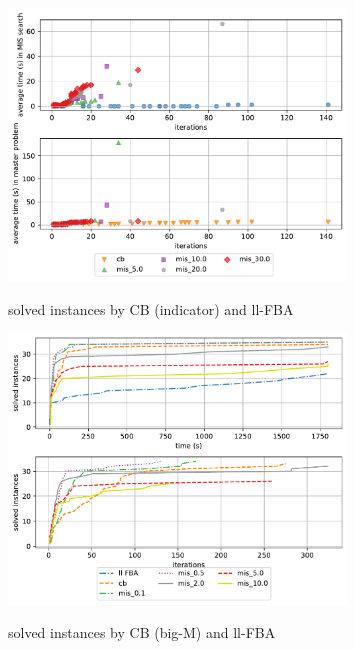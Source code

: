 \begin{figure}[h!]
    \caption{solved instances by CB (indicator) and ll-FBA}
    \centering
    \includegraphics[width=0.8\textwidth]{Images/mis_comparison_time_vs_iterations.pdf}
    \label{fig:mis_comparison_time_vs_iterations}
\end{figure}

\begin{figure}[h!]
    \caption{solved instances by CB (big-M) and ll-FBA}
    \centering
    \includegraphics[width=0.8\textwidth]{Images/mis_comparison_solved_instances_big_m.pdf}
    \label{fig:mis_comparison_solved_instances_big_m}
\end{figure}

